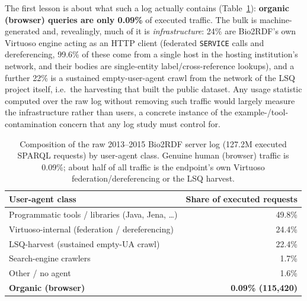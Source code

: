 \documentclass[sw]{iosart2x}
\begin{document}
The first lesson is about what such a log actually contains (Table~\ref{tab:bio2013comp}): \textbf{organic (browser) queries are only 0.09\%} of executed traffic. The bulk is machine-generated and, revealingly, much of it is \emph{infrastructure}: 24\% are Bio2RDF's own Virtuoso engine acting as an HTTP client (federated \texttt{SERVICE} calls and dereferencing, 99.6\% of these come from a single host in the hosting institution's network, and their bodies are single-entity label/cross-reference lookups), and a further 22\% is a sustained empty-user-agent crawl from the network of the LSQ project itself, i.e.\ the harvesting that built the public dataset. Any usage statistic computed over the raw log without removing such traffic would largely measure the infrastructure rather than users, a concrete instance of the example-/tool-contamination concern that any log study must control for.

\begin{table}[ht]
\centering
\caption{Composition of the raw 2013--2015 Bio2RDF server log (127.2M executed SPARQL requests) by user-agent class. Genuine human (browser) traffic is 0.09\%; about half of all traffic is the endpoint's own Virtuoso federation/dereferencing or the LSQ harvest.}
\label{tab:bio2013comp}
\begin{tabular}{l|r}
\hline
User-agent class & Share of executed requests \\
\hline
Programmatic tools / libraries (Java, Jena, \ldots) & 49.8\% \\
Virtuoso-internal (federation / dereferencing) & 24.4\% \\
LSQ-harvest (sustained empty-UA crawl) & 22.4\% \\
Search-engine crawlers & 1.7\% \\
Other / no agent & 1.6\% \\
\textbf{Organic (browser)} & \textbf{0.09\% (115{,}420)} \\
\hline
\end{tabular}
\end{table}
\end{document}
